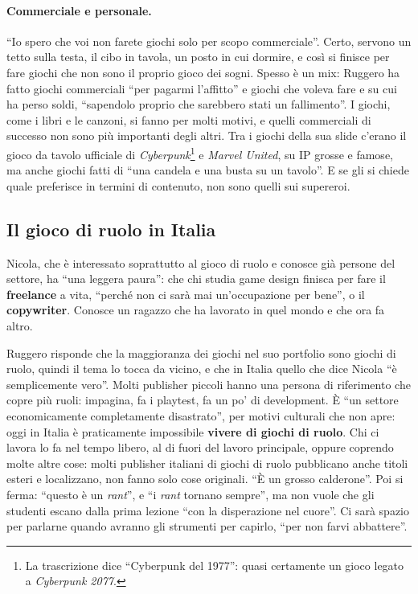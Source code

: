 \paragraph{Commerciale e personale.} ``Io spero che voi non farete giochi solo
per scopo commerciale''. Certo, servono un tetto sulla testa, il cibo in
tavola, un posto in cui dormire, e così si finisce per fare giochi che non sono
il proprio gioco dei sogni. Spesso è un mix: Ruggero ha fatto giochi commerciali
``per pagarmi l'affitto'' e giochi che voleva fare e su cui ha perso soldi,
``sapendolo proprio che sarebbero stati un fallimento''. I giochi, come i libri e
le canzoni, si fanno per molti motivi, e quelli commerciali di successo non sono
più importanti degli altri. Tra i giochi della sua slide c'erano il gioco da
tavolo ufficiale di \emph{Cyberpunk}\footnote{La trascrizione dice ``Cyberpunk
del 1977'': quasi certamente un gioco legato a \emph{Cyberpunk 2077}.} e
\emph{Marvel United}, su IP grosse e famose, ma anche giochi fatti di ``una
candela e una busta su un tavolo''. E se gli si chiede quale preferisce in
termini di contenuto, non sono quelli sui supereroi.

\subsection{Il gioco di ruolo in Italia}

Nicola, che è interessato soprattutto al gioco di ruolo e conosce già persone
del settore, ha ``una leggera paura'': che chi studia game design finisca per
fare il \textbf{freelance} a vita, ``perché non ci sarà mai un'occupazione per
bene'', o il \textbf{copywriter}. Conosce un ragazzo che ha lavorato in quel
mondo e che ora fa altro.

Ruggero risponde che la maggioranza dei giochi nel suo portfolio sono giochi di
ruolo, quindi il tema lo tocca da vicino, e che in Italia quello che dice Nicola
``è semplicemente vero''. Molti publisher piccoli hanno una persona di
riferimento che copre più ruoli: impagina, fa i playtest, fa un po' di
development. È ``un settore economicamente completamente disastrato'', per
motivi culturali che non apre: oggi in Italia è praticamente impossibile
\textbf{vivere di giochi di ruolo}. Chi ci lavora lo fa nel tempo libero, al di
fuori del lavoro principale, oppure coprendo molte altre cose: molti publisher
italiani di giochi di ruolo pubblicano anche titoli esteri e localizzano, non
fanno solo cose originali. ``È un grosso calderone''. Poi si ferma: ``questo è
un \emph{rant}'', e ``i \emph{rant} tornano sempre'', ma non vuole che gli
studenti escano dalla prima lezione ``con la disperazione nel cuore''. Ci sarà
spazio per parlarne quando avranno gli strumenti per capirlo, ``per non farvi
abbattere''.

